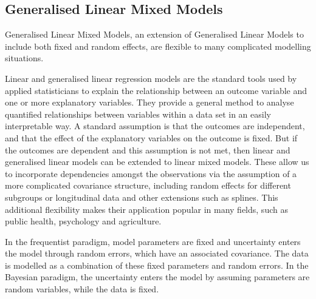 \subsection{Generalised Linear Mixed Models}
Generalised Linear Mixed Models, an extension of Generalised Linear Models to include both fixed and random
effects, are flexible to many complicated modelling situations.

Linear and generalised linear regression models are the standard tools used by applied statisticians to
explain the relationship between an outcome variable and one or more explanatory variables. They provide a
general method  to analyse quantified relationships between variables within a data set in an easily
interpretable way. A standard assumption is that the outcomes are independent, and that the effect of the
explanatory variables on the outcome is fixed. But if the outcomes are dependent and this assumption is not
met, then linear and generalised linear models can be extended to linear mixed models. These allow us to
incorporate dependencies amongst the  observations via the assumption of a more complicated covariance
structure, including random effects for  different subgroups or longitudinal data and other extensions such as
splines. This additional flexibility makes their application popular in many fields, such as public health,
psychology and agriculture.

In the frequentist paradigm, model parameters are fixed and uncertainty enters the model through random
errors, which have an associated covariance. The data is modelled as a combination of these fixed parameters
and random errors. In the Bayesian paradigm, the uncertainty enters the model by assuming parameters are
random variables, while the data is fixed.

